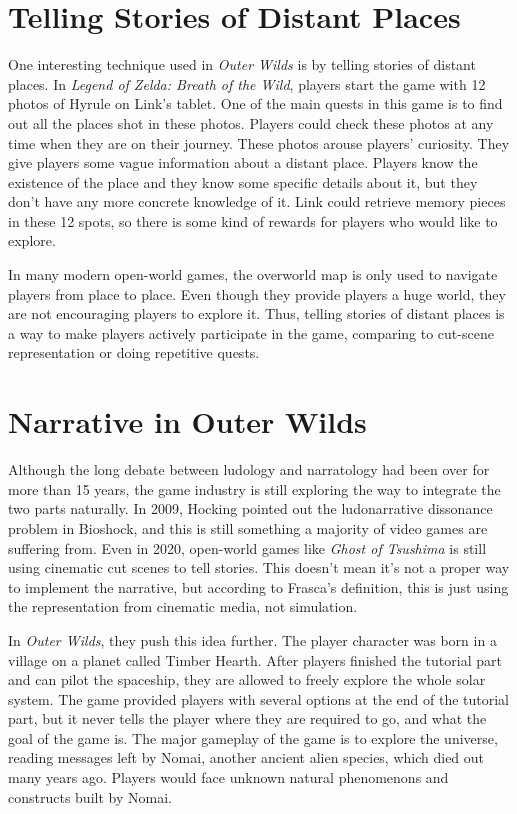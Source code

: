 \documentclass[doc, biblatex]{apa6}
\begin{document}
\section{Telling Stories of Distant Places}
One interesting technique used in \textit{Outer Wilds} is by telling stories
of distant places. In \textit{Legend of Zelda: Breath of the Wild}, players
start the game with 12 photos of Hyrule on Link's tablet. One of the main quests
in this game is to find out all the places shot in these photos. Players could
check these photos at any time when they are on their journey. These photos
arouse players' curiosity. They give players some vague information about a
distant place. Players know the existence of the place and they know some
specific details about it, but they don't have any more concrete knowledge of
it. Link could retrieve memory pieces in these 12 spots, so there is some kind
of rewards for players who would like to explore.

In many modern open-world games, the overworld map is only used to navigate
players from place to place. Even though they provide players a huge world, they
are not encouraging players to explore it. Thus, telling stories of distant
places is a way to make players actively participate in the game, comparing to
cut-scene representation or doing repetitive quests.

\section{Narrative in Outer Wilds}
Although the long debate between ludology and narratology had been over for more
than 15 years, the game industry is still exploring the way to integrate the two
parts naturally. In 2009, Hocking pointed out the ludonarrative dissonance
problem in Bioshock, and this is still something a majority of video games are
suffering from\parencite{hocking2009ludonarrative}. Even in 2020, open-world
games like \textit{Ghost of Tsushima} is still using cinematic cut scenes to
tell stories. This doesn't mean it's not a proper way to implement the
narrative, but according to Frasca's definition, this is just using the
representation from cinematic media, not
simulation\parencite{frasca2003simulation}.

In \textit{Outer Wilds}, they push this idea further. The player character was
born in a village on a planet called Timber Hearth. After players finished the
tutorial part and can pilot the spaceship, they are allowed to freely explore
the whole solar system. The game provided players with several options at the
end of the tutorial part, but it never tells the player where they are required
to go, and what the goal of the game is. The major gameplay of the game is to
explore the universe, reading messages left by Nomai, another ancient alien
species, which died out many years ago. Players would face unknown natural
phenomenons and constructs built by Nomai.
\end{document}
